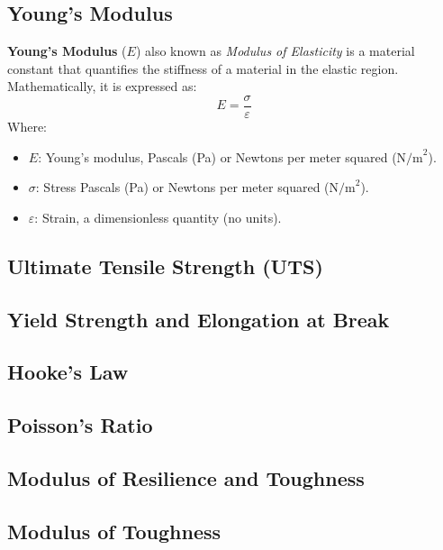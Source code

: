 \documentclass{article}
\begin{document}
        
    \subsection{Young's Modulus}
    \textbf{Young's Modulus} (\(E\)) also known as \textit{Modulus of Elasticity} is a material constant that quantifies the stiffness of a material in the elastic region. Mathematically, it is expressed as:\\[8pt]
    \begin{equation}
        E = \frac{\sigma}{\varepsilon}
    \end{equation}
    Where:
    \begin{itemize}
        \item \( E \): Young's modulus, Pascals (Pa) or Newtons per meter squared (\(\text{N/m}^2\)).
        \item \( \sigma \): Stress Pascals (Pa) or Newtons per meter squared (\(\text{N/m}^2\)).
        \item \( \varepsilon \): Strain, a dimensionless quantity (no units).
    \end{itemize}
        
    \subsection{Ultimate Tensile Strength (UTS)}
    
    \subsection{Yield Strength and Elongation at Break}
    
    \subsection{Hooke's Law}
    
    \subsection{Poisson's Ratio}
    
    \subsection{Modulus of Resilience and Toughness}
    
    \subsection{Modulus of Toughness}
    
\end{document}
